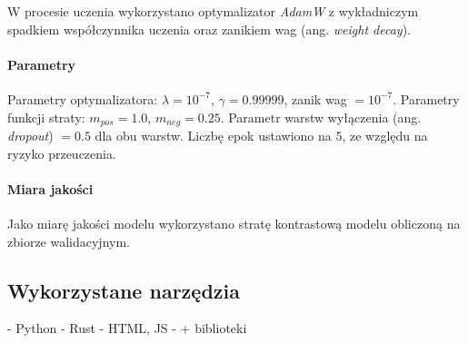                         W procesie uczenia wykorzystano optymalizator \textit{AdamW} \cite{Loshchilov2017DecoupledWD} z wykładniczym spadkiem współczynnika uczenia oraz zanikiem wag (ang. \textit{weight decay}).
                
                    \paragraph{Parametry}
    
                         Parametry optymalizatora: $\lambda = 10^{-7}$, $\gamma = 0.99999$, zanik wag $= 10^{-7}$.  Parametry funkcji straty: $m_{pos} = 1.0$, $m_{neg} = 0.25$. Parametr warstw wyłączenia (ang. \textit{dropout}) $= 0.5$ dla obu warstw. Liczbę epok ustawiono na $5$, ze względu na ryzyko przeuczenia.
    
    
                    \paragraph{Miara jakości}
                    
                        Jako miarę jakości modelu wykorzystano stratę kontrastową modelu obliczoną na zbiorze walidacyjnym.

    \subsection{Wykorzystane narzędzia}
    - Python
    - Rust
    - HTML, JS 
    - + biblioteki